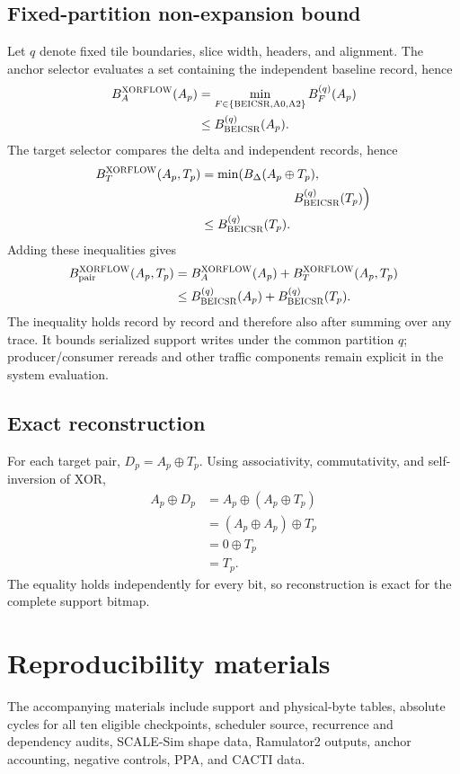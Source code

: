 \documentclass[10pt,conference]{IEEEtran}
\newcommand{\sys}{\textsc{XORFLOW}}
\newcommand{\beicsr}{\textsc{BEICSR}}
\newcommand{\xor}{\mathbin{\oplus}}
\begin{document}
\subsection{Fixed-partition non-expansion bound}
Let $q$ denote fixed tile boundaries, slice width, headers, and alignment. The anchor selector evaluates a set containing the independent baseline record, hence
\begin{align}
B_A^{\sys}(A_p)
&=\min_{F\in\{\beicsr,\mathrm{A0},\mathrm{A2}\}} B_F^{(q)}(A_p)\\
&\le B_{\beicsr}^{(q)}(A_p).
\end{align}
The target selector compares the delta and independent records, hence
\begin{align}
B_T^{\sys}(A_p,T_p)
&=\min\!\left( B_{\Delta}(A_p\xor T_p),\right.\\
&\hspace{25mm}\left.B_{\beicsr}^{(q)}(T_p)\right)\\
&\le B_{\beicsr}^{(q)}(T_p).
\end{align}
Adding these inequalities gives
\begin{align}
B_{\mathrm{pair}}^{\sys}(A_p,T_p)
&=B_A^{\sys}(A_p)+B_T^{\sys}(A_p,T_p)\\
&\le B_{\beicsr}^{(q)}(A_p)+B_{\beicsr}^{(q)}(T_p).
\end{align}
The inequality holds record by record and therefore also after summing over any trace. It bounds serialized support writes under the common partition $q$; producer/consumer rereads and other traffic components remain explicit in the system evaluation.

\subsection{Exact reconstruction}
For each target pair, $D_p=A_p\xor T_p$. Using associativity, commutativity, and self-inversion of XOR,
\begin{align}
A_p\xor D_p
&=A_p\xor(A_p\xor T_p)\\
&=(A_p\xor A_p)\xor T_p\\
&=0\xor T_p\\
&=T_p.
\end{align}
The equality holds independently for every bit, so reconstruction is exact for the complete support bitmap.

\section{Reproducibility materials}
The accompanying materials include support and physical-byte tables, absolute cycles for all ten eligible checkpoints, scheduler source, recurrence and dependency audits, SCALE-Sim shape data, Ramulator2 outputs, anchor accounting, negative controls, PPA, and CACTI data.
\end{document}
